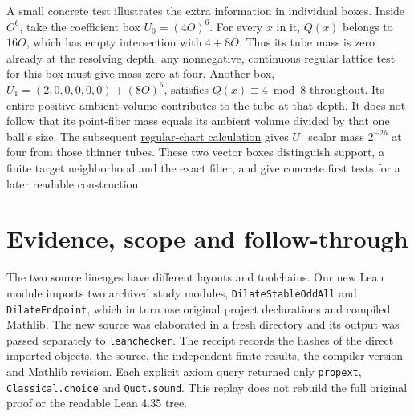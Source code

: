 \documentclass[12pt,letterpaper]{article}
\newcommand{\id}[1]{{\small\nolinkurl{#1}}}
\begin{document}
A small concrete test illustrates the extra information in individual boxes. Inside $O^6$, take the coefficient box $U_0=(4O)^6$. For every $x$ in it, $Q(x)$ belongs to $16O$, which has empty intersection with $4+8O$. Thus its tube mass is zero already at the resolving depth; any nonnegative, continuous regular lattice test for this box must give mass zero at four. Another box, $U_1=(2,0,0,0,0,0)+(8O)^6$, satisfies $Q(x)\equiv4\bmod8$ throughout. Its entire positive ambient volume contributes to the tube at that depth. It does not follow that its point-fiber mass equals its ambient volume divided by that one ball's size. The subsequent \href{https://github.com/nousentllc/riemann-hypothesis/tree/d69e65e6ac84b552fd7b0f112570904abe2ebdb1/research/uriel/experiments/target-four-regular-chart}{regular-chart calculation} gives $U_1$ scalar mass $2^{-26}$ at four from those thinner tubes. These two vector boxes distinguish support, a finite target neighborhood and the exact fiber, and give concrete first tests for a later readable construction.

\section{Evidence, scope and follow-through}
The two source lineages have different layouts and toolchains. Our new Lean module imports two archived study modules, \id{DilateStableOddAll} and \id{DilateEndpoint}, which in turn use original project declarations and compiled Mathlib. The new source was elaborated in a fresh directory and its output was passed separately to \id{leanchecker}. The receipt records the hashes of the direct imported objects, the source, the independent finite results, the compiler version and Mathlib revision. Each explicit axiom query returned only \id{propext}, \id{Classical.choice} and \id{Quot.sound}. This replay does not rebuild the full original proof or the readable Lean 4.35 tree.
\end{document}
